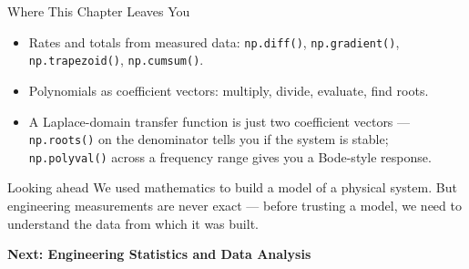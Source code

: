 \documentclass[9pt,aspectratio=169,xcolor=table]{beamer}
\begin{document}
\begin{frame}{Where This Chapter Leaves You}
    \leavevmode
    \small
    \begin{itemize}
        \item Rates and totals from \alert{measured data}: \texttt{np.diff()},
              \texttt{np.gradient()}, \texttt{np.trapezoid()},
              \texttt{np.cumsum()}.
        \item Polynomials as \alert{coefficient vectors}: multiply,
              divide, evaluate, find roots.
        \item A Laplace-domain transfer function is just \alert{two
              coefficient vectors} --- \texttt{np.roots()} on the
              denominator tells you if the system is stable;
              \texttt{np.polyval()} across a frequency range gives you
              a Bode-style response.
    \end{itemize}

    \vspace{3mm}
    \begin{alertblock}{Looking ahead}
        We used mathematics to build a model of a physical system. But
        engineering measurements are never exact --- before trusting a
        model, we need to understand the data from which it was built.
    \end{alertblock}

    \vspace{2mm}
    \begin{center}
        \large\color{primary}\textbf{Next: Engineering Statistics and
        Data Analysis}
    \end{center}
\end{frame}
\end{document}
